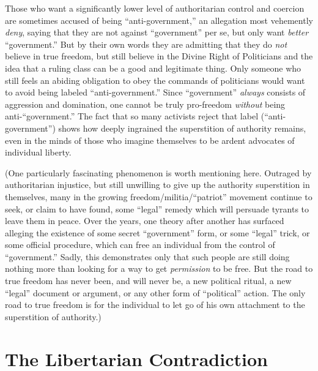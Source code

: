 \documentclass{book}
\begin{document}
Those who want a significantly lower level of authoritarian control and coercion are sometimes accused of being \enquote{anti-government,} an allegation most vehemently \emph{deny}, saying that they are not against \enquote{government} per se, but only want \emph{better} \enquote{government.} But by their own words they are admitting that they do \emph{not} believe in true freedom, but still believe in the Divine Right of Politicians and the idea that a ruling class can be a good and legitimate thing. Only someone who still feels an abiding obligation to obey the commands of politicians would want to avoid being labeled \enquote{anti-government.} Since \enquote{government} \emph{always} consists of aggression and domination, one cannot be truly pro-freedom \emph{without} being anti-\enquote{government.} The fact that so many activists reject that label (\enquote{anti-government}) shows how deeply ingrained the superstition of authority remains, even in the minds of those who imagine themselves to be ardent advocates of individual liberty.

(One particularly fascinating phenomenon is worth mentioning here. Outraged by authoritarian injustice, but still unwilling to give up the authority superstition in themselves, many in the growing freedom/militia/\enquote{patriot} movement continue to seek, or claim to have found, some \enquote{legal} remedy which will persuade tyrants to leave them in peace. Over the years, one theory after another has surfaced alleging the existence of some secret \enquote{government} form, or some \enquote{legal} trick, or some official procedure, which can free an individual from the control of \enquote{government.} Sadly, this demonstrates only that such people are still doing nothing more than looking for a way to get \emph{permission} to be free. But the road to true freedom has never been, and will never be, a new political ritual, a new \enquote{legal} document or argument, or any other form of \enquote{political} action. The only road to true freedom is for the individual to let go of his own attachment to the superstition of authority.)

\section{The Libertarian Contradiction}
\end{document}
